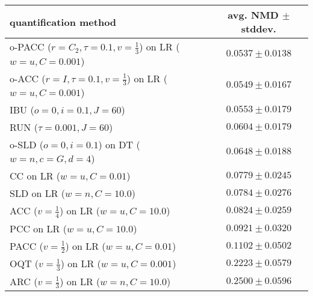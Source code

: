 \begin{tabular}{lc}
  \toprule
  quantification method & avg. NMD $\pm$ stddev. \\
  \midrule
  o-PACC ($r=C_2, \tau=0.1, v=\frac{1}{3}$) on LR ($w=u, C=0.001$) & $\mathbf{0.0537 \pm 0.0138}$ \\
  o-ACC ($r=I, \tau=0.1, v=\frac{1}{3}$) on LR ($w=u, C=0.001$) & $0.0549 \pm 0.0167$ \\
  IBU ($o=0, i=0.1, J=60$) & $0.0553 \pm 0.0179$ \\
  RUN ($\tau=0.001, J=60$) & $0.0604 \pm 0.0179$ \\
  o-SLD ($o=0, i=0.1$) on DT ($w=n, c=G, d=4$) & $0.0648 \pm 0.0188$ \\
  CC on LR ($w=u, C=0.01$) & $0.0779 \pm 0.0245$ \\
  SLD on LR ($w=n, C=10.0$) & $0.0784 \pm 0.0276$ \\
  ACC ($v=\frac{1}{4}$) on LR ($w=u, C=10.0$) & $0.0824 \pm 0.0259$ \\
  PCC on LR ($w=u, C=10.0$) & $0.0921 \pm 0.0320$ \\
  PACC ($v=\frac{1}{2}$) on LR ($w=u, C=0.01$) & $0.1102 \pm 0.0502$ \\
  OQT ($v=\frac{1}{3}$) on LR ($w=u, C=0.001$) & $0.2223 \pm 0.0579$ \\
  ARC ($v=\frac{1}{3}$) on LR ($w=n, C=10.0$) & $0.2500 \pm 0.0596$ \\
  \bottomrule
\end{tabular}
